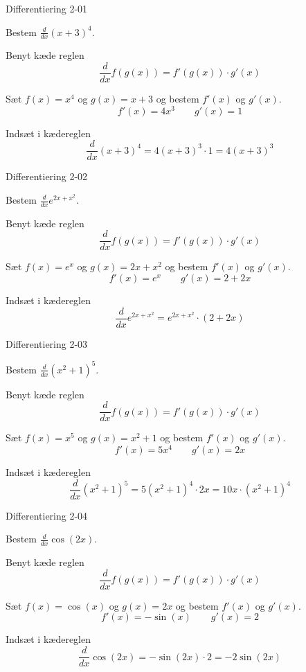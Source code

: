 \documentclass{article}
\begin{document}
\tableofcontents
\newpage

\begin{exercise}{Differentiering 2-01}

Bestem $\frac{d}{dx} (x + 3)^4$.


\hint
Benyt kæde reglen
\[
\frac{d}{dx} f(g(x)) = f'(g(x)) \cdot g'(x)
\]

\hint
Sæt $f(x) = x^4$ og $g(x) = x + 3$ og bestem $f'(x)$ og $g'(x)$.
\[
f'(x) = 4 x^3 \qquad g'(x) = 1
\]

\hint
Indsæt i kædereglen
\[
\frac{d}{dx} (x + 3)^4 = 4 (x + 3)^3 \cdot 1 = 4 (x + 3)^3
\]

\end{exercise}

\begin{exercise}{Differentiering 2-02}

Bestem $\frac{d}{dx} e^{2x + x^2}$.


\hint
Benyt kæde reglen
\[
\frac{d}{dx} f(g(x)) = f'(g(x)) \cdot g'(x)
\]

\hint
Sæt $f(x) = e^x$ og $g(x) = 2x + x^2$ og bestem $f'(x)$ og $g'(x)$.
\[
f'(x) = e^x \qquad g'(x) = 2 + 2x
\]

\hint
Indsæt i kædereglen
\[
\frac{d}{dx} e^{2x + x^2} = e^{2x + x^2} \cdot (2 + 2x)
\]

\end{exercise}

\begin{exercise}{Differentiering 2-03}

Bestem $\frac{d}{dx} \left(x^2 + 1 \right)^5 $.


\hint
Benyt kæde reglen
\[
\frac{d}{dx} f(g(x)) = f'(g(x)) \cdot g'(x)
\]

\hint
Sæt $f(x) = x^5$ og $g(x) = x^2 + 1$ og bestem $f'(x)$ og $g'(x)$.
\[
f'(x) = 5x^4 \qquad g'(x) = 2x
\]

\hint
Indsæt i kædereglen
\[
\frac{d}{dx} \left(x^2 + 1 \right)^5 = 5 \left(x^2 + 1 \right)^4 \cdot 2x = 10 x \cdot \left(x^2 + 1 \right)^4
\]

\end{exercise}

\begin{exercise}{Differentiering 2-04}

Bestem $\frac{d}{dx} \cos(2x)$.


\hint
Benyt kæde reglen
\[
\frac{d}{dx} f(g(x)) = f'(g(x)) \cdot g'(x)
\]

\hint
Sæt $f(x) = \cos(x)$ og $g(x) = 2x$ og bestem $f'(x)$ og $g'(x)$.
\[
f'(x) = - \sin(x) \qquad g'(x) = 2
\]

\hint
Indsæt i kædereglen
\[
\frac{d}{dx} \cos(2x) = - \sin(2x) \cdot 2 = -2 \sin(2x)
\]

\end{exercise}
\end{document}
